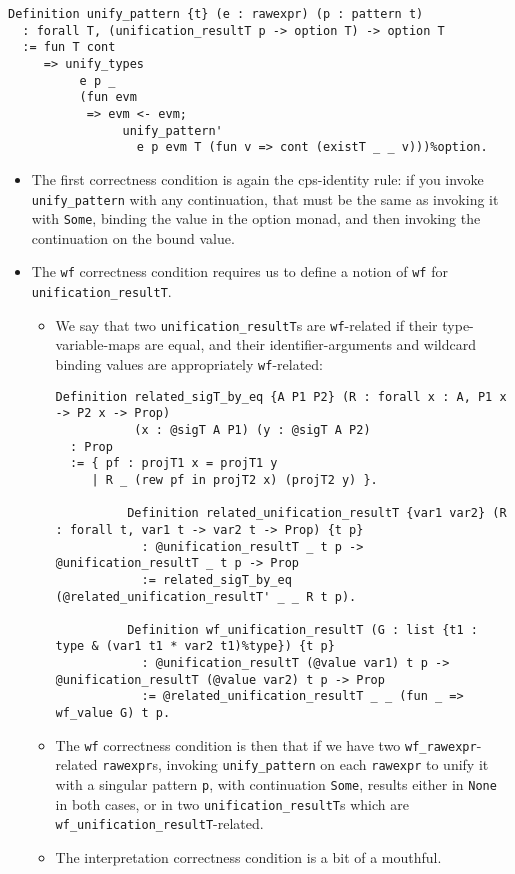 \begin{itemize}
\begin{itemize}
\begin{itemize}
\begin{verbatim}
Definition unify_pattern {t} (e : rawexpr) (p : pattern t)
  : forall T, (unification_resultT p -> option T) -> option T
  := fun T cont
     => unify_types
          e p _
          (fun evm
           => evm <- evm;
                unify_pattern'
                  e p evm T (fun v => cont (existT _ _ v)))%option.
\end{verbatim}

      \begin{itemize}
      \tightlist
      \item
        The first correctness condition is again the cps-identity rule:
        if you invoke \texttt{unify\_pattern} with any continuation,
        that must be the same as invoking it with \texttt{Some}, binding
        the value in the option monad, and then invoking the
        continuation on the bound value.
      \item
        The \texttt{wf} correctness condition requires us to define a
        notion of \texttt{wf} for \texttt{unification\_resultT}.

        \begin{itemize}
        \item
          We say that two \texttt{unification\_resultT}s are
          \texttt{wf}-related if their type-variable-maps are equal, and
          their identifier-arguments and wildcard binding values are
          appropriately \texttt{wf}-related:

\begin{verbatim}
Definition related_sigT_by_eq {A P1 P2} (R : forall x : A, P1 x -> P2 x -> Prop)
           (x : @sigT A P1) (y : @sigT A P2)
  : Prop
  := { pf : projT1 x = projT1 y
     | R _ (rew pf in projT2 x) (projT2 y) }.

          Definition related_unification_resultT {var1 var2} (R : forall t, var1 t -> var2 t -> Prop) {t p}
            : @unification_resultT _ t p -> @unification_resultT _ t p -> Prop
            := related_sigT_by_eq (@related_unification_resultT' _ _ R t p).

          Definition wf_unification_resultT (G : list {t1 : type & (var1 t1 * var2 t1)%type}) {t p}
            : @unification_resultT (@value var1) t p -> @unification_resultT (@value var2) t p -> Prop
            := @related_unification_resultT _ _ (fun _ => wf_value G) t p.
\end{verbatim}
        \item
          The \texttt{wf} correctness condition is then that if we have
          two \texttt{wf\_rawexpr}-related \texttt{rawexpr}s, invoking
          \texttt{unify\_pattern} on each \texttt{rawexpr} to unify it
          with a singular pattern \texttt{p}, with continuation
          \texttt{Some}, results either in \texttt{None} in both cases,
          or in two \texttt{unification\_resultT}s which are
          \texttt{wf\_unification\_resultT}-related.
        \item
          The interpretation correctness condition is a bit of a
          mouthful.


\end{itemize}
\end{itemize}
\end{itemize}
\end{itemize}
\end{itemize}
